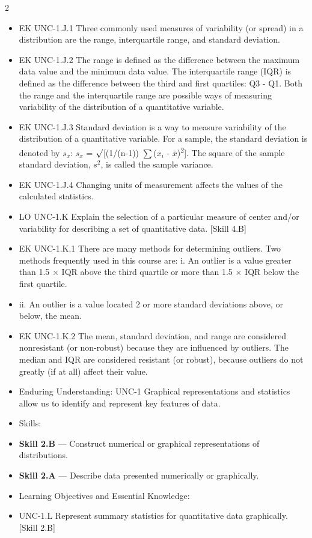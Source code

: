 \documentclass[11pt]{article}
\begin{document}
\begin{multicols}{2}
{\begin{itemize}[leftmargin=*,itemsep=0pt,topsep=0pt]
\item EK UNC-1.J.1 Three commonly used measures of variability (or spread) in a distribution are the range, interquartile range, and standard deviation.
\item EK UNC-1.J.2 The range is defined as the difference between the maximum data value and the minimum data value. The interquartile range (IQR) is defined as the difference between the third and first quartiles: Q3 - Q1. Both the range and the interquartile range are possible ways of measuring variability of the distribution of a quantitative variable.
\item EK UNC-1.J.3 Standard deviation is a way to measure variability of the distribution of a quantitative variable. For a sample, the standard deviation is denoted by $s_x$: $s_x$ = $\surd$[(1/(n-1)) $\sum$($x_i$ - $\bar{x}$)\textsuperscript{2}]. The square of the sample standard deviation, $s^2$, is called the sample variance.
\item EK UNC-1.J.4 Changing units of measurement affects the values of the calculated statistics.
\item LO UNC-1.K Explain the selection of a particular measure of center and/or variability for describing a set of quantitative data. [Skill 4.B]
\item EK UNC-1.K.1 There are many methods for determining outliers. Two methods frequently used in this course are: i. An outlier is a value greater than 1.5 $\times$ IQR above the third quartile or more than 1.5 $\times$ IQR below the first quartile.
\item ii. An outlier is a value located 2 or more standard deviations above, or below, the mean.
\item EK UNC-1.K.2 The mean, standard deviation, and range are considered nonresistant (or non-robust) because they are influenced by outliers. The median and IQR are considered resistant (or robust), because outliers do not greatly (if at all) affect their value.
\item Enduring Understanding: UNC-1 Graphical representations and statistics allow us to identify and represent key features of data.
\item Skills:
\item \textbf{Skill 2.B} --- Construct numerical or graphical representations of distributions.
\item \textbf{Skill 2.A} --- Describe data presented numerically or graphically.
\item Learning Objectives and Essential Knowledge:
\item UNC-1.L Represent summary statistics for quantitative data graphically. [Skill 2.B]

\end{itemize}}
\end{multicols}
\end{document}
